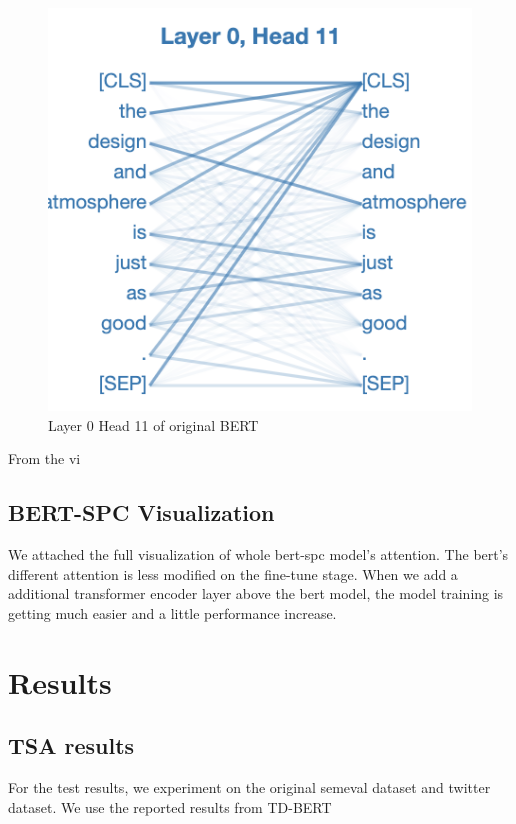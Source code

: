 \documentclass[fyp]{socreport}
\begin{document}
\begin{figure}[h]
    \centering
    \includegraphics[width=\linewidth]{./image/L0H11.png}
    \caption{Layer 0 Head 11 of original BERT}
  \label{Framework}
\end{figure}

From the vi

\subsection{BERT-SPC Visualization}
We attached the full visualization of whole bert-spc model's attention. The bert's different attention is less modified on the fine-tune stage. When we add a additional transformer encoder layer above the bert model, the model training is getting much easier and a little performance increase.



\section{Results}
\subsection{TSA results}
For the test results, we experiment on the original semeval dataset and twitter dataset. We use the reported results from TD-BERT \cite{8864964}
\end{document}
